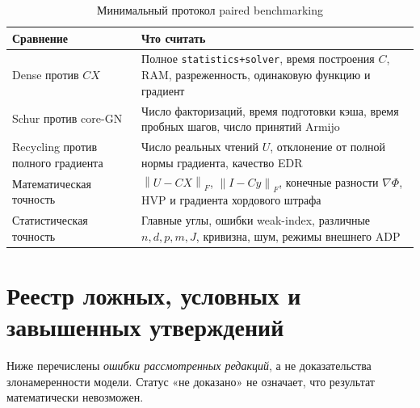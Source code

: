 \documentclass[10.5pt,a4paper]{article}
\newcommand{\norm}[1]{\left\|#1\right\|}
\numberwithin{equation}{section}
\theoremstyle{plain}
\theoremstyle{definition}
\begin{document}
\begin{table}[ht]
\centering\small
\caption{Минимальный протокол paired benchmarking}
\begin{tabularx}{\linewidth}{@{}P{36mm}L@{}}\toprule
Сравнение & Что считать\\\midrule
Dense против $CX$ & Полное \texttt{statistics+solver}, время построения $C$, RAM, разреженность, одинаковую функцию и градиент\\
Schur против core-GN & Число факторизаций, время подготовки кэша, время пробных шагов, число принятий Armijo\\
Recycling против полного градиента & Число реальных чтений $U$, отклонение от полной нормы градиента, качество EDR\\
Математическая точность & $\norm{U-CX}_F$, $\norm{I-Cy}_F$, конечные разности $\nabla\Phi$, HVP и градиента хордового штрафа\\
Статистическая точность & Главные углы, ошибки weak-index, различные $n,d,p,m,J$, кривизна, шум, режимы внешнего ADP\\
\bottomrule\end{tabularx}
\label{tab:bench}
\end{table}

\section{Реестр ложных, условных и завышенных утверждений}
Ниже перечислены \emph{ошибки рассмотренных редакций}, а не доказательства злонамеренности модели. Статус «не доказано» не означает, что результат математически невозможен.
\end{document}
